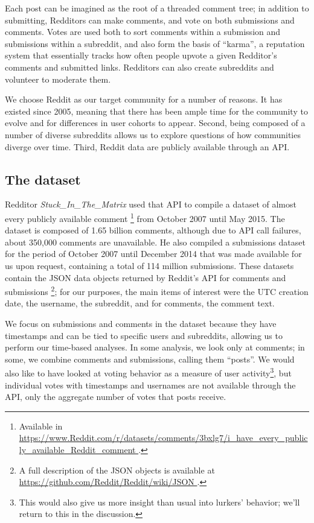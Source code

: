 
Each post can be imagined as the root of a threaded comment tree; in addition to submitting, Redditors can make comments, and vote on both submissions and comments.  Votes are used both to sort comments within a submission and submissions within a subreddit, and also form the basis of ``karma'', a reputation system that essentially tracks how often people upvote a given Redditor's comments and submitted links.  Redditors can also create subreddits and volunteer to moderate them.

We choose Reddit as our target community for a number of reasons.  It has existed since 2005, meaning that there has been ample time for the community to evolve and for differences in user cohorts to appear.  Second, being composed of a number of diverse subreddits allows us to explore questions of how communities diverge over time.  Third, Reddit data are publicly available through an API.

\subsection{The dataset}

Redditor \textit{Stuck\_In\_The\_Matrix} used that API to compile a dataset of almost every publicly available comment \footnote{Available in \url{https://www.Reddit.com/r/datasets/comments/3bxlg7/i_have_every_publicly_available_Reddit_comment }.} from October 2007 until May 2015.  The dataset is composed of 1.65 billion comments, although due to API call failures, about 350,000 comments are unavailable.  He also compiled a submissions dataset for the period of October 2007 until December 2014 that was made available for us upon request, containing a total of 114 million submissions.  These datasets contain the JSON data objects returned by Reddit's API for comments and submissions \footnote{A full description of the JSON objects is available at \url{https://github.com/Reddit/Reddit/wiki/JSON }.}; for our purposes, the main items of interest were the UTC creation date, the username, the subreddit, and for comments, the comment text.

We focus on submissions and comments in the dataset because they have timestamps and can be tied to specific users and subreddits, allowing us to perform our time-based analyses.   In some analysis, we look only at comments; in some, we combine comments and submissions, calling them ``posts''.  We would also like to have looked at voting behavior as a measure of user activity\footnote{This would also give us more insight than usual into lurkers' behavior; we'll return to this in the discussion.}, but individual votes with timestamps and usernames are not available through the API, only the aggregate number of votes that posts receive.

